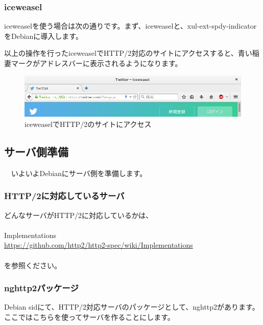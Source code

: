 \documentclass[mingoth,a4paper]{jsarticle}
\begin{document}
\subsubsection{iceweasel}

 iceweaselを使う場合は次の通りです。まず、iceweaselと、xul-ext-spdy-indicatorをDebianに導入します。
  

以上の操作を行ったiceweaselでHTTP/2対応のサイトにアクセスすると、青い稲妻マークがアドレスバーに表示されるようになります。

\begin{figure}[H]
\begin{center}
 \includegraphics[width=0.9\hsize]{image201507/iceweasel-http-2-ready.png}
\end{center}
\caption{iceweaselでHTTP/2のサイトにアクセス}
\end{figure}

\subsection{サーバ側準備}

　いよいよDebianにサーバ側を準備します。

\subsubsection{HTTP/2に対応しているサーバ}

 どんなサーバがHTTP/2に対応しているかは、\\
\\
 Implementations \\
  \url{https://github.com/http2/http2-spec/wiki/Implementations}\\
\\
 を参照ください。

\subsubsection{nghttp2パッケージ}

 Debian sidにて、HTTP/2対応サーバのパッケージとして、nghttp2があります。ここではこちらを使ってサーバを作ることにします。
\end{document}
